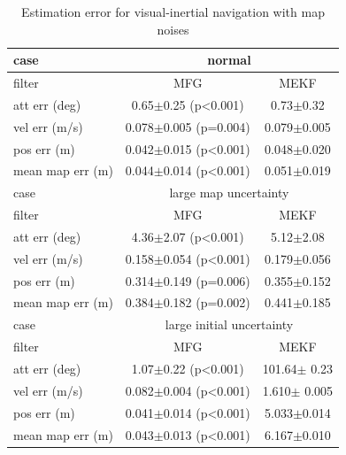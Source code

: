 \begin{table}
	\centering
	\caption{Estimation error for visual-inertial navigation with map noises}
	\label{tab:VIO-map-filter-error1}
	\small
	\begin{tabular}{l|cc}
		\hline\hline
		case & \multicolumn{2}{c}{normal} \\ \hline
		filter & MFG & MEKF \\ \hline
		att err (deg) & 0.65$\pm$0.25 (p<0.001) & 0.73$\pm$0.32 \\
		vel err (m/s) & 0.078$\pm$0.005 (p=0.004) & 0.079$\pm$0.005 \\
		pos err (m) & 0.042$\pm$0.015 (p<0.001) & 0.048$\pm$0.020 \\
		mean map err (m) & 0.044$\pm$0.014 (p<0.001) & 0.051$\pm$0.019 \\
		\hline\hline
		case & \multicolumn{2}{c}{large map uncertainty} \\ \hline
		filter & MFG & MEKF \\ \hline
		att err (deg) & 4.36$\pm$2.07 (p<0.001) & 5.12$\pm$2.08 \\
		vel err (m/s) & 0.158$\pm$0.054 (p<0.001) & 0.179$\pm$0.056 \\
		pos err (m) & 0.314$\pm$0.149 (p=0.006) & 0.355$\pm$0.152 \\
		mean map err (m) & 0.384$\pm$0.182 (p=0.002) & 0.441$\pm$0.185 \\
		\hline\hline
		case & \multicolumn{2}{c}{large initial uncertainty} \\ \hline
		filter & MFG & MEKF \\ \hline
		att err (deg) & 1.07$\pm$0.22 (p<0.001) & 101.64$\pm$ 0.23 \\
		vel err (m/s) & 0.082$\pm$0.004 (p<0.001) & 1.610$\pm$ 0.005 \\
		pos err (m) & 0.041$\pm$0.014 (p<0.001) & 5.033$\pm$0.014 \\
		mean map err (m) & 0.043$\pm$0.013 (p<0.001) & 6.167$\pm$0.010 \\
		\hline\hline
	\end{tabular}
\end{table}


